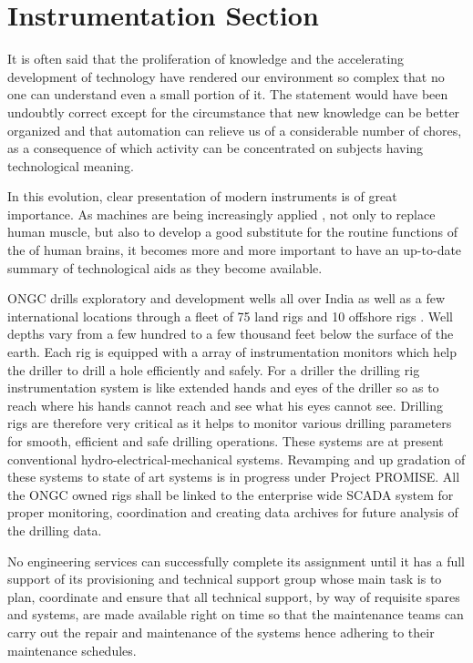 \chapter{Instrumentation Section}

It is often said that the proliferation of knowledge and the accelerating development of technology 
have rendered our environment so complex that no one can understand even a small portion of it. 
The statement would have been undoubtly correct except for the circumstance that new knowledge can 
be better organized and that automation can relieve us of a considerable number of chores, as a
consequence of which activity can be concentrated on subjects having technological meaning. 

\vspace{1em}

In this evolution, clear presentation of modern instruments is of great importance. As machines are
being increasingly applied , not only to replace human muscle, but also to develop a good substitute 
for the routine functions of the of human brains, it becomes more and more important to have an 
up-to-date summary of technological aids as they become available.

\vspace{1em}

ONGC drills exploratory and development wells all over India as well as a few international 
locations through a fleet of 75 land rigs and 10 offshore rigs . Well depths vary from a few 
hundred to a few thousand feet below the surface of the earth. Each rig is equipped with a array 
of instrumentation monitors which help the driller to drill a hole efficiently and safely. 
For a driller the drilling rig instrumentation system is like extended hands and eyes of the driller 
so as to reach where his hands cannot reach and see what his eyes cannot see. Drilling rigs are 
therefore very critical as it helps to monitor various drilling parameters for smooth,
efficient and safe drilling operations. These systems are at present conventional
hydro-electrical-mechanical systems. Revamping and up gradation of these systems to state of art 
systems is in progress under Project PROMISE. All the ONGC owned rigs shall be linked to 
the enterprise wide SCADA system for proper monitoring, coordination and creating data archives 
for future analysis of the drilling data.


\vspace{1em}

No engineering services can successfully complete its assignment until it has a full support 
of its provisioning and technical support group whose main task is to plan, coordinate and ensure
that all technical support, by way of requisite spares and systems, are made available right on
time so that the maintenance teams can carry out the repair and maintenance of the systems hence
adhering to their maintenance schedules.

